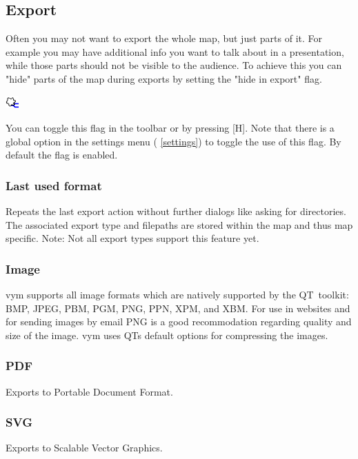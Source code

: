 \documentclass[12pt,a4paper]{article}
\newcommand{\vym}{{\sc vym }}
\newcommand{\key}[1]{[#1]}
\begin{document}
\subsection{Export}  \label{export}
\label{hideexport}
Often you may not want to export the whole map, but just parts of it.
For example you may have additional info you want to talk about in a
presentation, while those parts should not be visible to the audience.
To achieve this you can "hide" parts of the map during exports by
setting the "hide in export" flag.
\begin{center}
    \includegraphics[width=0.5cm]{images/flag-hideexport.png}
\end{center}
You can toggle this flag in the toolbar or by pressing \key{H}.  Note
that there is a global option in the settings menu ( \ref{settings}) to
toggle the use of this flag. By default the flag is enabled.

\subsubsection*{Last used format}
Repeats the last export action without further dialogs like asking for
directories. The associated export type and filepaths are stored within
the map and thus map specific. Note: Not all export types support this
feature yet.

\subsubsection*{Image}
\vym supports all image formats which are natively supported by the
QT~toolkit:
BMP, JPEG, PBM, PGM, PNG, PPN, XPM, and XBM.
For use in websites and for sending images by email PNG is a good
recommodation regarding quality and size of the image. \vym uses QTs
default options for compressing the images.

\subsubsection*{PDF}
Exports to Portable Document Format.

\subsubsection*{SVG}
Exports to Scalable Vector Graphics.
\end{document}
